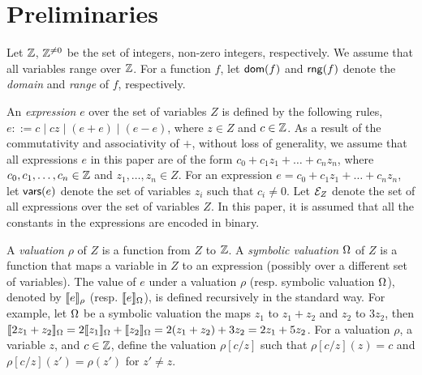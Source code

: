 
\section{Preliminaries}
\label{sec:preliminaries}
Let ${\mathbb{Z} }$,  $\mathbb{Z}^{\neq 0}$ be the set of integers, non-zero integers, respectively.
We assume that all variables range over ${\mathbb{Z} }$.  
For a function $f$, let $\mathsf{dom}(f)$ and $\mathsf{rng}(f)$ denote the \emph{domain}  and \emph{range} of $f$, respectively. 

An \emph{expression} $e$ over the set of variables $Z$ is defined by the following rules, $e::=  c \mid  c z \mid (e + e) \mid (e - e)$, where $z \in Z$ and $c\in {\mathbb{Z} }$.  As a result of the commutativity and associativity of $+$, without loss of generality, we assume that all expressions $e$ in this paper are of the form $c_0 + c_1 z_1 + \dots + c_n z_n$, where $c_0, c_1,\dots,c_n \in {\mathbb{Z} }$ and $z_1,\dots,z_n \in Z$. 
For an expression $e=c_0+c_1 z_1 + \dots + c_n z_n$, let $\mathsf{vars}(e)$ denote the set of variables $z_i$ such that $c_i \neq 0$. Let ${\mathcal{E} }_Z$ denote the set of all expressions over the set of variables $Z$. In this paper, it is assumed that all the constants in the expressions are encoded in binary.


A \emph{valuation} $\rho$ of $Z$ is a function from $Z$ to ${\mathbb{Z} }$. A \emph{symbolic valuation} $\Omega$ of $Z$ is a function that maps a variable in $Z$ to an expression (possibly over a different set of variables). The value of $e$ under a valuation $\rho$ (resp. symbolic valuation $\Omega$), denoted by $\llbracket e\rrbracket_{\rho}$ (resp. $\llbracket e\rrbracket_{\Omega}$), is defined recursively in the standard way. For example, let $\Omega$ be a symbolic valuation the maps $z_1$ to $z_1+z_2$ and $z_2$ to $3z_2$, then $\llbracket2z_1+z_2\rrbracket_{\Omega}=2\llbracket z_1\rrbracket_{\Omega}+\llbracket z_2\rrbracket_{\Omega}=2(z_1+z_2)+3z_2=2z_1+5z_2$.
For a valuation $\rho$, a variable $z$, and $c \in {\mathbb{Z} }$, define the valuation $\rho[c/z]$ such that $\rho[c/z](z)=c$ and $\rho[c/z](z')=\rho(z')$ for $z'\neq z$. 

